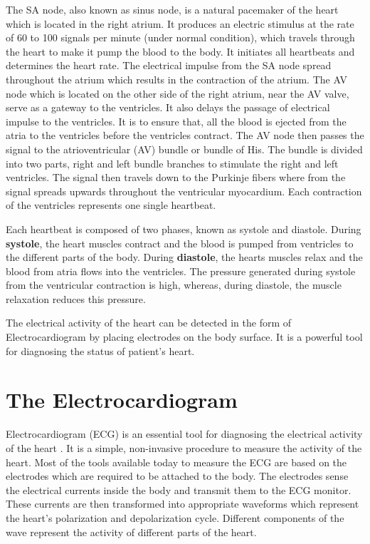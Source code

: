 The SA node, also known as sinus node, is a natural pacemaker of the heart which is located in the right atrium. It produces an electric stimulus at the rate of 60 to 100 signals per minute (under normal condition), which travels through the heart to make it pump the blood to the body. It initiates all heartbeats and determines the heart rate. The electrical impulse from the SA node spread throughout the atrium which results in the contraction of the atrium. The AV node which is located on the other side of the right atrium, near the AV valve, serve as a gateway to the ventricles. It also delays the passage of electrical impulse to the ventricles. It is to ensure that, all the blood is ejected from the atria to the ventricles before the ventricles contract. The AV node then passes the signal to the atrioventricular (AV) bundle or bundle of His. The bundle is divided into two parts, right and left bundle branches to stimulate the right and left ventricles. The signal then travels down to the Purkinje fibers where from the signal spreads upwards throughout the ventricular myocardium. Each contraction of the ventricles represents one single heartbeat.

Each heartbeat is composed of two phases, known as systole and diastole. During \textbf{systole}, the heart muscles contract and the blood is pumped from ventricles to the different parts of the body. During \textbf{diastole}, the hearts muscles relax and the blood from atria flows into the ventricles. The pressure generated during systole from the ventricular contraction is high, whereas, during diastole, the muscle relaxation reduces this pressure.

The electrical activity of the heart can be detected in the form of Electrocardiogram by placing electrodes on the body surface. It is a powerful tool for diagnosing the status of patient's heart.



\section{The Electrocardiogram} \label{the_electrocardiogram}

Electrocardiogram (ECG) is an essential tool for diagnosing the electrical activity of the heart \cite{wilkins2005ecg}. It is a simple, non-invasive procedure to measure the activity of the heart. Most of the tools available today to measure the ECG are based on the electrodes which are required to be attached to the body. The electrodes sense the electrical currents inside the body and transmit them to the ECG monitor. These currents are then transformed into appropriate waveforms which represent the heart's polarization and depolarization cycle. Different components of the wave represent the activity of different parts of the heart.


